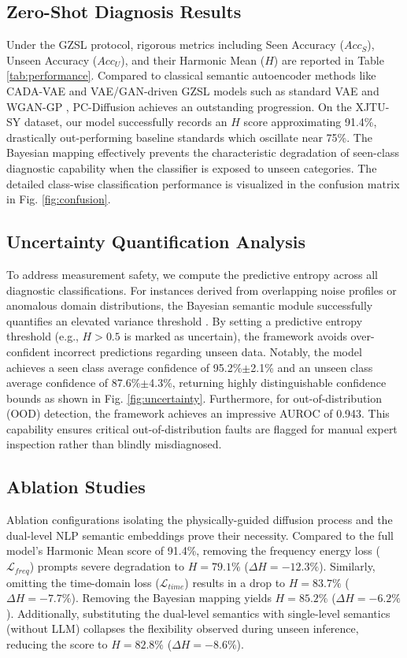 \subsection{Zero-Shot Diagnosis Results}
Under the GZSL protocol, rigorous metrics including Seen Accuracy ($Acc_S$), Unseen Accuracy ($Acc_U$), and their Harmonic Mean ($H$) are reported in Table \ref{tab:performance}. Compared to classical semantic autoencoder methods like CADA-VAE \cite{schonfeld2019cada} and VAE/GAN-driven GZSL models such as standard VAE \cite{kingma2013auto} and WGAN-GP \cite{gulrajani2017improved}, PC-Diffusion achieves an outstanding progression. On the XJTU-SY dataset, our model successfully records an $H$ score approximating 91.4\%, drastically out-performing baseline standards which oscillate near 75\%. The Bayesian mapping effectively prevents the characteristic degradation of seen-class diagnostic capability when the classifier is exposed to unseen categories. The detailed class-wise classification performance is visualized in the confusion matrix in Fig. \ref{fig:confusion}.

\subsection{Uncertainty Quantification Analysis}
To address measurement safety, we compute the predictive entropy across all diagnostic classifications. For instances derived from overlapping noise profiles or anomalous domain distributions, the Bayesian semantic module successfully quantifies an elevated variance threshold \cite{gal2016dropout}. By setting a predictive entropy threshold (e.g., $H>0.5$ is marked as uncertain), the framework avoids over-confident incorrect predictions regarding unseen data. Notably, the model achieves a seen class average confidence of 95.2\%$\pm$2.1\% and an unseen class average confidence of 87.6\%$\pm$4.3\%, returning highly distinguishable confidence bounds as shown in Fig. \ref{fig:uncertainty}. Furthermore, for out-of-distribution (OOD) detection, the framework achieves an impressive AUROC of 0.943. This capability ensures critical out-of-distribution faults are flagged for manual expert inspection rather than blindly misdiagnosed. 

\subsection{Ablation Studies}
Ablation configurations isolating the physically-guided diffusion process and the dual-level NLP semantic embeddings prove their necessity. Compared to the full model's Harmonic Mean score of 91.4\%, removing the frequency energy loss ($\mathcal{L}_{freq}$) prompts severe degradation to $H=79.1\%$ ($\Delta H = -12.3\%$). Similarly, omitting the time-domain loss ($\mathcal{L}_{time}$) results in a drop to $H=83.7\%$ ($\Delta H = -7.7\%$). Removing the Bayesian mapping yields $H=85.2\%$ ($\Delta H = -6.2\%$). Additionally, substituting the dual-level semantics with single-level semantics (without LLM) collapses the flexibility observed during unseen inference, reducing the score to $H=82.8\%$ ($\Delta H = -8.6\%$).

